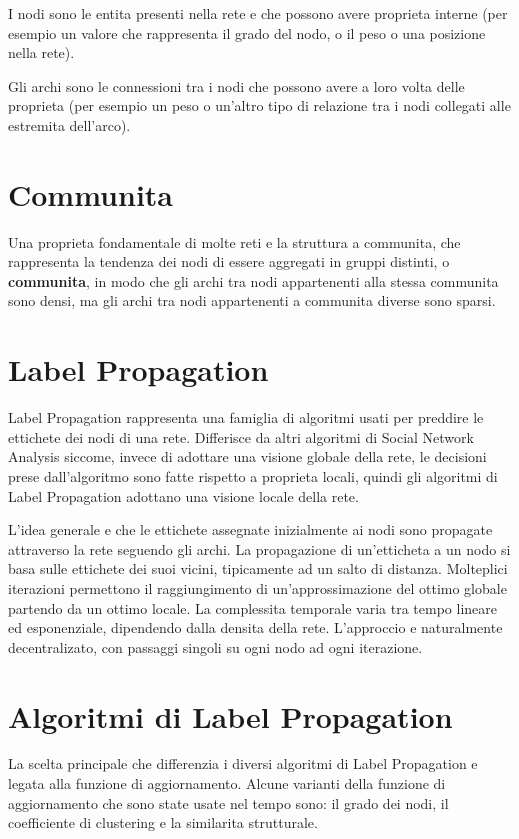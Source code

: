 \documentclass[a4paper,12pt]{report}
\begin{document}
	 I nodi sono le entita presenti nella rete e che possono avere proprieta interne (per esempio un valore che rappresenta il grado del nodo, o il peso o una posizione nella rete). 

	Gli archi sono le connessioni tra i nodi che possono avere a loro volta delle proprieta (per esempio un peso o un'altro tipo di relazione tra i nodi collegati alle estremita dell'arco).	\cite{snaintro} 

	\section{Communita}
	Una proprieta fondamentale di molte reti e la struttura a communita, che rappresenta la tendenza dei nodi di essere aggregati in gruppi distinti, o \textbf{communita}, in modo che gli archi tra nodi appartenenti alla stessa communita sono densi, ma gli archi tra nodi appartenenti a communita diverse sono sparsi. \cite{gregory}

	\section{Label Propagation}
	Label Propagation rappresenta una famiglia di algoritmi usati per preddire le ettichete dei nodi di una rete. 
	Differisce da altri algoritmi di Social Network Analysis siccome, invece di adottare una visione globale della rete, le decisioni prese dall'algoritmo sono fatte rispetto a proprieta locali, quindi gli algoritmi di Label Propagation adottano una visione locale della rete. \cite{raghavan} 

	L'idea generale e che le ettichete assegnate inizialmente ai nodi sono propagate attraverso la rete seguendo gli archi. La propagazione di un'etticheta a un nodo si basa sulle ettichete dei suoi vicini, tipicamente ad un salto di distanza. Molteplici iterazioni permettono il raggiungimento di un'approssimazione del ottimo globale partendo da un ottimo locale. La complessita temporale varia tra tempo lineare ed esponenziale, dipendendo dalla densita della rete. L'approccio e naturalmente decentralizato, con passaggi singoli su ogni nodo ad ogni iterazione. \cite{avpra}
	
	\section{Algoritmi di Label Propagation}
	La scelta principale che differenzia i diversi algoritmi di Label Propagation e legata alla funzione di aggiornamento. Alcune varianti della funzione di aggiornamento che sono state usate nel tempo sono: il grado dei nodi, il coefficiente di clustering e la similarita strutturale.
\end{document}
